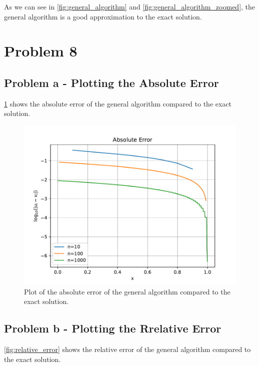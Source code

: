 \documentclass[english,notitlepage]{revtex4-1}  %
\begin{document}
As we can see in \figurename{ \ref{fig:general_algorithm}} and \figurename{ \ref{fig:general_algorithm_zoomed}}, the general algorithm is a good approximation to the exact solution.

\section*{Problem 8}
\subsection*{Problem a - Plotting the Absolute Error}
\figurename{ \ref{fig:absolute_error}} shows the absolute error of the general algorithm compared to the exact solution.

\begin{figure}[h!]
    \centering %
    \includegraphics[scale=0.70]{problem8/absolute_error_plot.pdf} %
    \caption{Plot of the absolute error of the general algorithm compared to the exact solution.} %
    \label{fig:absolute_error} %
\end{figure}

\subsection*{Problem b - Plotting the Rrelative Error}
\figurename{ \ref{fig:relative_error}} shows the relative error of the general algorithm compared to the exact solution.
\end{document}
